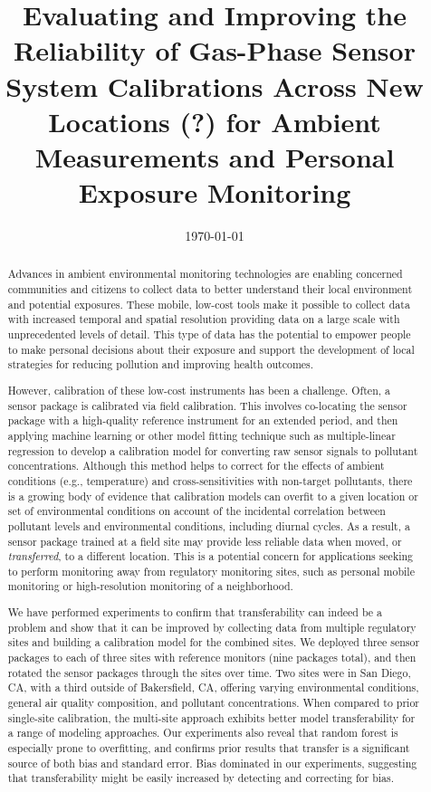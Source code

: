 \documentclass[journal abbreviation, manuscript]{copernicus}
\title{Evaluating and Improving the Reliability of Gas-Phase Sensor System Calibrations Across New Locations (?) for Ambient Measurements and Personal Exposure Monitoring}
\date{\today}
\affil[1]{University of California, San Diego}
\affil[2]{University of Colorado, Boulder}
\begin{document}
\maketitle

\begin{abstract}

Advances in ambient environmental monitoring technologies are enabling concerned communities and citizens to collect data to better understand their local environment and potential exposures. These mobile, low-cost tools make it possible to collect data with increased temporal and spatial resolution providing data on a large scale with unprecedented levels of detail. This type of data has the potential to empower people to make personal decisions about their exposure and support the development of local strategies for reducing pollution and improving health outcomes.

However, calibration of these low-cost instruments has been a challenge.  Often, a sensor package is calibrated via field calibration. This involves co-locating the sensor package with a high-quality reference instrument for an extended period, and then applying machine learning or other model fitting technique such as multiple-linear regression to develop a calibration model for converting raw sensor signals to pollutant concentrations.  Although this method helps to correct for the effects of ambient conditions (e.g., temperature) and cross-sensitivities with non-target pollutants, there is a growing body of evidence that calibration models can overfit to a given location or set of environmental conditions on account of the incidental correlation between pollutant levels and environmental conditions, including diurnal cycles.  As a result, a sensor package trained at a field site may provide less reliable data when moved, or \textit{transferred}, to a different location.  This is a potential concern for applications seeking to perform monitoring away from regulatory monitoring sites, such as personal mobile monitoring or high-resolution monitoring of a neighborhood.  




We have performed experiments to confirm that transferability can indeed be a problem and show that it can be improved by collecting data from multiple regulatory sites and building a calibration model for the combined sites. We deployed three sensor packages to each of three sites with reference monitors (nine packages total), and then rotated the sensor packages through the sites over time. Two sites were in San Diego, CA, with a third outside of Bakersfield, CA, offering varying environmental conditions, general air quality composition, and pollutant concentrations.  When compared to prior single-site calibration, the multi-site approach exhibits better model transferability for a range of modeling approaches.  Our experiments also reveal that random forest is especially prone to overfitting, and confirms prior results that transfer is a significant source of both bias and standard error.  Bias dominated in our experiments, suggesting that transferability might be easily increased by detecting and correcting for bias.


\end{abstract}
\end{document}
